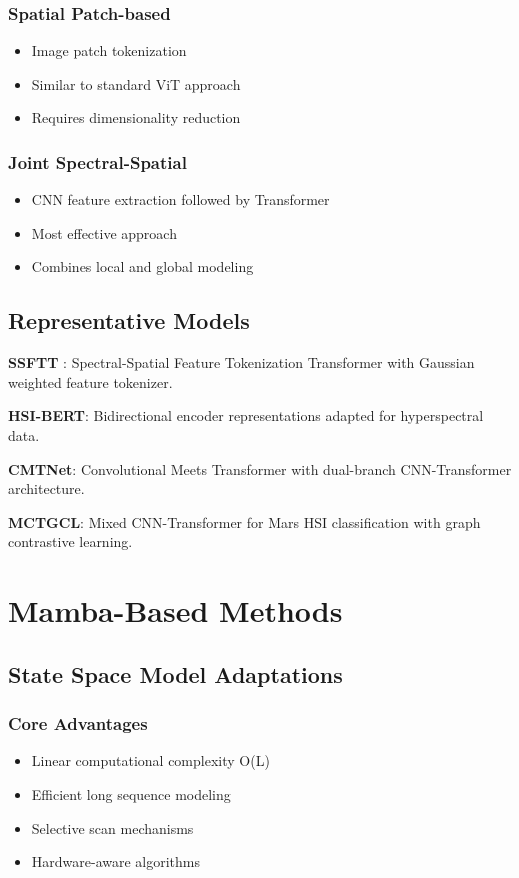 \documentclass[journal]{IEEEtran}
\begin{document}
\subsubsection{Spatial Patch-based}
\begin{itemize}
\item Image patch tokenization
\item Similar to standard ViT approach
\item Requires dimensionality reduction
\end{itemize}

\subsubsection{Joint Spectral-Spatial}
\begin{itemize}
\item CNN feature extraction followed by Transformer
\item Most effective approach
\item Combines local and global modeling
\end{itemize}

\subsection{Representative Models}

\textbf{SSFTT} \cite{sun2022spectral}: Spectral-Spatial Feature Tokenization Transformer with Gaussian weighted feature tokenizer.

\textbf{HSI-BERT}: Bidirectional encoder representations adapted for hyperspectral data.

\textbf{CMTNet}: Convolutional Meets Transformer with dual-branch CNN-Transformer architecture.

\textbf{MCTGCL}: Mixed CNN-Transformer for Mars HSI classification with graph contrastive learning.

\section{Mamba-Based Methods}

\subsection{State Space Model Adaptations}

\subsubsection{Core Advantages}
\begin{itemize}
\item Linear computational complexity O(L)
\item Efficient long sequence modeling
\item Selective scan mechanisms
\item Hardware-aware algorithms
\end{itemize}
\end{document}
